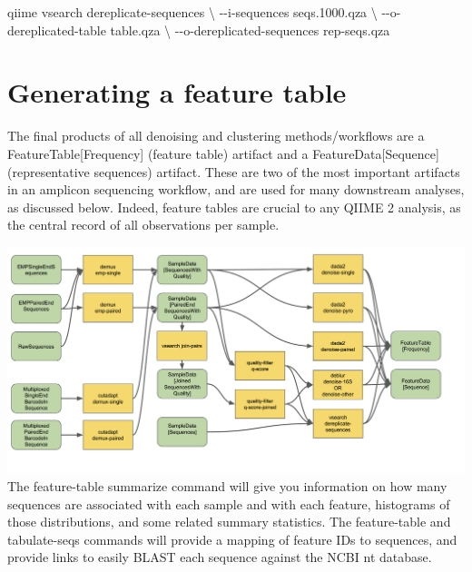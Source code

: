 \documentclass[
]{book}
\newenvironment{Shaded}{\begin{snugshade}}{\end{snugshade}}
\newcommand{\DataTypeTok}[1]{\textcolor[rgb]{0.13,0.29,0.53}{#1}}
\newcommand{\ExtensionTok}[1]{#1}
\newcommand{\NormalTok}[1]{#1}
\begin{document}
\begin{Shaded}
\begin{Highlighting}[]

\ExtensionTok{qiime}\NormalTok{ vsearch dereplicate{-}sequences }\DataTypeTok{\textbackslash{}}
\NormalTok{{-}{-}i{-}sequences seqs.1000.qza }\DataTypeTok{\textbackslash{}}
\NormalTok{{-}{-}o{-}dereplicated{-}table table.qza }\DataTypeTok{\textbackslash{}}
\NormalTok{{-}{-}o{-}dereplicated{-}sequences rep{-}seqs.qza }
\end{Highlighting}
\end{Shaded}

\hypertarget{generating-a-feature-table}{%
\section{Generating a feature table}\label{generating-a-feature-table}}

The final products of all denoising and clustering methods/workflows are a FeatureTable{[}Frequency{]} (feature table) artifact and a FeatureData{[}Sequence{]} (representative sequences) artifact. These are two of the most important artifacts in an amplicon sequencing workflow, and are used for many downstream analyses, as discussed below. Indeed, feature tables are crucial to any QIIME 2 analysis, as the central record of all observations per sample.

\includegraphics[width=1\textwidth,height=\textheight]{./QIIMEpics/derep-denoise.png}
The feature-table summarize command will give you information on how many sequences are associated with each sample and with each feature, histograms of those distributions, and some related summary statistics. The feature-table and tabulate-seqs commands will provide a mapping of feature IDs to sequences, and provide links to easily BLAST each sequence against the NCBI nt database.
\end{document}
